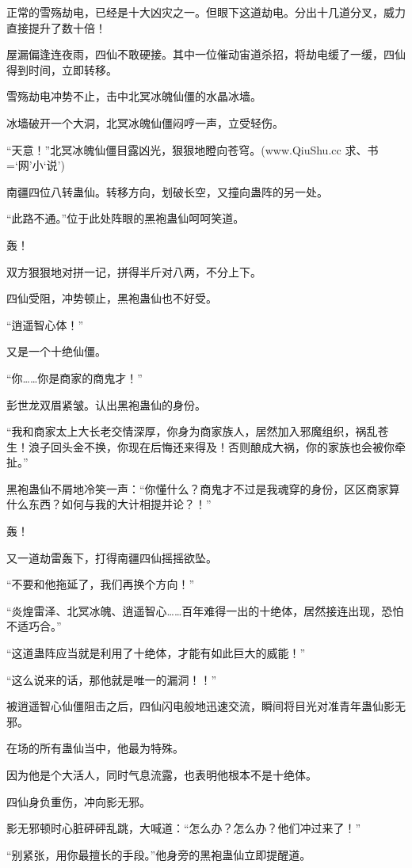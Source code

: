 \begin{this_body}
正常的雪殇劫电，已经是十大凶灾之一。但眼下这道劫电。分出十几道分叉，威力直接提升了数十倍！

屋漏偏逢连夜雨，四仙不敢硬接。其中一位催动宙道杀招，将劫电缓了一缓，四仙得到时间，立即转移。

雪殇劫电冲势不止，击中北冥冰魄仙僵的水晶冰墙。

冰墙破开一个大洞，北冥冰魄仙僵闷哼一声，立受轻伤。

“天意！”北冥冰魄仙僵目露凶光，狠狠地瞪向苍穹。(www.QiuShu.cc 求、书=‘网’小‘说’)

南疆四位八转蛊仙。转移方向，划破长空，又撞向蛊阵的另一处。

“此路不通。”位于此处阵眼的黑袍蛊仙呵呵笑道。

轰！

双方狠狠地对拼一记，拼得半斤对八两，不分上下。

四仙受阻，冲势顿止，黑袍蛊仙也不好受。

“逍遥智心体！”

又是一个十绝仙僵。

“你……你是商家的商鬼才！”

彭世龙双眉紧皱。认出黑袍蛊仙的身份。

“我和商家太上大长老交情深厚，你身为商家族人，居然加入邪魔组织，祸乱苍生！浪子回头金不换，你现在后悔还来得及！否则酿成大祸，你的家族也会被你牵扯。”

黑袍蛊仙不屑地冷笑一声：“你懂什么？商鬼才不过是我魂穿的身份，区区商家算什么东西？如何与我的大计相提并论？！”

轰！

又一道劫雷轰下，打得南疆四仙摇摇欲坠。

“不要和他拖延了，我们再换个方向！”

“炎煌雷泽、北冥冰魄、逍遥智心……百年难得一出的十绝体，居然接连出现，恐怕不适巧合。”

“这道蛊阵应当就是利用了十绝体，才能有如此巨大的威能！”

“这么说来的话，那他就是唯一的漏洞！！”

被逍遥智心仙僵阻击之后，四仙闪电般地迅速交流，瞬间将目光对准青年蛊仙影无邪。

在场的所有蛊仙当中，他最为特殊。

因为他是个大活人，同时气息流露，也表明他根本不是十绝体。

四仙身负重伤，冲向影无邪。

影无邪顿时心脏砰砰乱跳，大喊道：“怎么办？怎么办？他们冲过来了！”

“别紧张，用你最擅长的手段。”他身旁的黑袍蛊仙立即提醒道。


\end{this_body}
